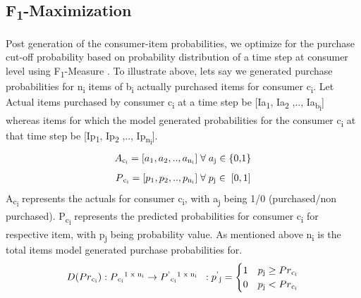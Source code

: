\subsection{F\textsubscript{1}-Maximization}
Post generation of the consumer-item probabilities, we optimize for the purchase cut-off probability based on 
probability distribution of a time step at consumer level using F\textsubscript{1}-Measure \cite{lipton2014optimal}. 
To illustrate above, lets say we generated purchase probabilities for 
n\textsubscript{i} items of b\textsubscript{i} actually purchased items for consumer c\textsubscript{i}.
Let Actual items purchased by consumer c\textsubscript{i} at a time step be [Ia\textsubscript{1}, Ia\textsubscript{2}
,.., Ia\textsubscript{b\textsubscript{i}}] whereas items for which the model generated probabilities for the 
consumer c\textsubscript{i} at that time step be [Ip\textsubscript{1}, Ip\textsubscript{2} ,.., 
Ip\textsubscript{n\textsubscript{i}}]. 
  \begin{equation}
    \begin{array}{l}
      A\textsubscript{c\textsubscript{i}} = [a\textsubscript{1}, a\textsubscript{2}, .., a\textsubscript{n\textsubscript{i}}] 
       \; \forall \; a\textsubscript{j} \in \; $\{0,1\}$
    \end{array}
    \label{eqn:A}
  \end{equation}
  \begin{equation}
    \begin{array}{l}
      P\textsubscript{c\textsubscript{i}} = [p\textsubscript{1}, p\textsubscript{2}, .., p\textsubscript{n\textsubscript{i}}]
      \; \forall \; p\textsubscript{j} \in \; [0,1]
    \end{array}
    \label{eqn:P}
  \end{equation}
A\textsubscript{c\textsubscript{i}} represents the actuals for consumer c\textsubscript{i}, with a\textsubscript{j} being 1/0 
(purchased/non purchased). P\textsubscript{c\textsubscript{i}} represents the predicted probabilities 
for consumer c\textsubscript{i} for respective item, with p\textsubscript{j} being probability value. 
As mentioned above n\textsubscript{i} is the total items model generated purchase probabilities for.
  \begin{equation}
    \begin{array}{l}
      D(Pr\textsubscript{c\textsubscript{i}}) : P\textsubscript{c\textsubscript{i}}\textsuperscript{1 x n\textsubscript{i}}
      \to P\textsuperscript{'}\textsubscript{c\textsubscript{i}}\textsuperscript{1 x n\textsubscript{i}}
      \;\; : p\textsuperscript{'}\textsubscript{j} = 
        \begin{cases}
          1 & p\textsubscript{j} \geq Pr\textsubscript{c\textsubscript{i}} \\
          0 & p\textsubscript{j} < Pr\textsubscript{c\textsubscript{i}} 
        \end{cases}
    \end{array}
    \label{eqn:Decision}
  \end{equation}
